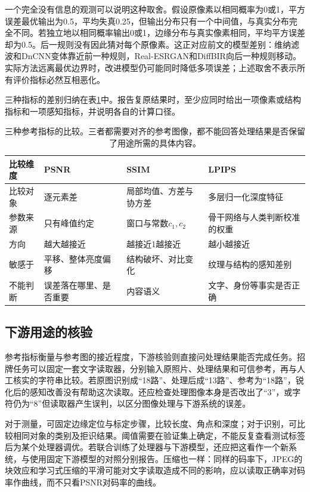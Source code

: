 一个完全没有信息的观测可以说明这种取舍。假设原像素以相同概率为0或1，平方误差最优输出为0.5，平均失真0.25，但输出分布只有一个中间值，与真实分布完全不同。若独立地以相同概率输出0或1，边缘分布与真实像素相同，平均平方误差却为0.5。后一规则没有因此猜对每个原像素。这正对应前文的模型差别：维纳滤波和DnCNN变体靠近前一种规则，Real-ESRGAN和DiffBIR向后一种规则移动。实际方法远离最优边界时，改进模型仍可能同时降低多项误差；上述取舍不表示所有评价指标必然互相恶化。

三种指标的差别归纳在表\ref{tab:vision-quality-metric-compare}中。报告复原结果时，至少应同时给出一项像素或结构指标和一项感知指标，并说明各自的计算口径。

\begin{table}[htbp]
 \centering
 \small
 \begin{tabularx}{\linewidth}{@{}p{14mm}XXX@{}}
  \toprule
  比较维度 & PSNR & SSIM & LPIPS\\
  \midrule
  比较对象 & 逐元素差 & 局部均值、方差与协方差 & 多层归一化深度特征\\
  参数来源 & 只有峰值约定 & 窗口与常数$c_1,c_2$ & 骨干网络与人类判断校准的权重\\
  方向 & 越大越接近 & 越接近1越接近 & 越小越接近\\
  敏感于 & 平移、整体亮度偏移 & 结构破坏、对比变化 & 纹理与结构的感知差别\\
  不能判断 & 误差落在哪里、是否重要 & 内容语义 & 文字、身份等事实是否正确\\
  \bottomrule
 \end{tabularx}
 \caption{三种参考指标的比较。三者都需要对齐的参考图像，都不能回答处理结果是否保留了用途所需的具体内容。}
 \label{tab:vision-quality-metric-compare}
\end{table}

\subsection{下游用途的核验}
\label{sec:vision-restoration-downstream}

参考指标衡量与参考图的接近程度，下游核验则直接问处理结果能否完成任务。招牌任务可以固定一套文字读取器，分别输入原照片、处理结果和可信参考，再与人工核实的字符串比较。若原图识别成“18路”、处理后成“13路”、参考为“18路”，锐化后的感知改善没有帮助这次读取。还应检查处理图像本身是否改出了“3”，或字符仍为“8”但读取器产生误判，以区分图像处理与下游系统的误差。

对于测量，可固定边缘定位与标定步骤，比较长度、角点和深度；对于识别，可比较相同对象的类别及拒识结果。阈值需要在验证集上确定，不能反复查看测试标签后为某个处理器调优。若联合训练了处理器与下游模型，还应把这看作一个新系统，与使用固定下游模型的对照分别报告。压缩也一样：同样的码率下，JPEG的块效应和学习式压缩的平滑可能对文字读取造成不同的影响，应以读取正确率对码率作曲线，而不只看PSNR对码率的曲线。

